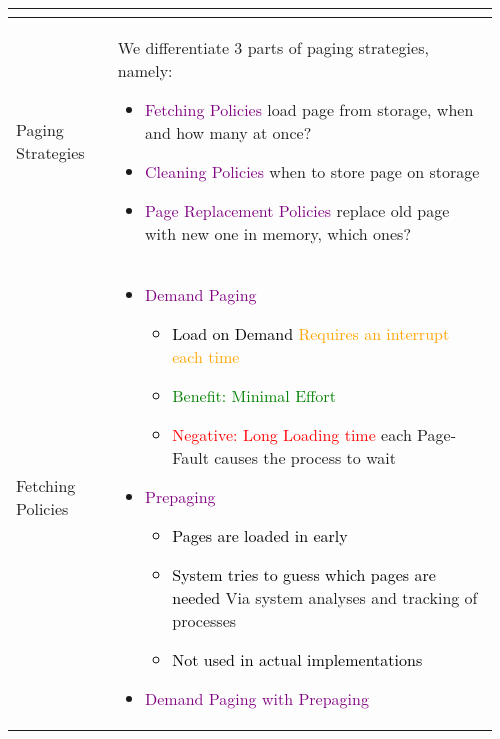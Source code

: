 \documentclass[main.tex,fontsize=8pt,paper=a4,paper=portrait,DIV=calc,]{scrartcl}
\begin{document}
\begin{table}[ht!]
\begin{tabular}{|m{0.2\linewidth}|m{0.755\linewidth}|}
\begin{itemize}
\vspace{-3mm}
\end{itemize} \\
\hline
Paging Strategies & 
We differentiate 3 parts of paging strategies, namely:\newline
\begin{itemize}
\item \textcolor{purple}{Fetching Policies}\newline
  load page from storage, when and how many at once?
\item \textcolor{purple}{Cleaning Policies}\newline
  when to store page on storage
\item \textcolor{purple}{Page Replacement Policies}\newline
  replace old page with new one in memory, which ones?
\vspace{-3mm}
\end{itemize} 
\\
\hline
Fetching Policies & 
\vspace{2mm}
\begin{itemize}
\item \textcolor{purple}{Demand Paging}\newline
  \begin{itemize}
  \item \textcolor{black}{Load on Demand}\newline
    \textcolor{orange}{Requires an interrupt each time}
  \item \textcolor{green}{Benefit: Minimal Effort}
  \item \textcolor{red}{Negative: Long Loading time}\newline
    each Page-Fault causes the process to wait
  \end{itemize} 
\item \textcolor{purple}{Prepaging}
  \begin{itemize}
  \item \textcolor{black}{Pages are loaded in early}
  \item \textcolor{black}{System tries to guess which pages are needed}\newline
    Via system analyses and tracking of processes
  \item \textcolor{black}{Not used in actual implementations}
  \end{itemize} 
\item \textcolor{purple}{Demand Paging with Prepaging}\newline

\end{itemize}
\end{tabular}
\end{table}
\end{document}
